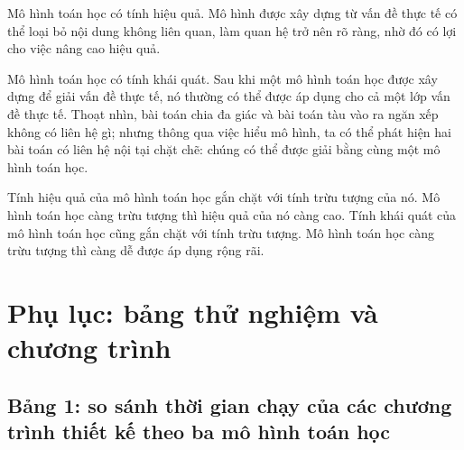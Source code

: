 \documentclass[11pt]{article}
\begin{document}
Mô hình toán học có tính hiệu quả. Mô hình được xây dựng từ vấn đề thực tế có
thể loại bỏ nội dung không liên quan, làm quan hệ trở nên rõ ràng, nhờ đó có
lợi cho việc nâng cao hiệu quả.

Mô hình toán học có tính khái quát. Sau khi một mô hình toán học được xây
dựng để giải vấn đề thực tế, nó thường có thể được áp dụng cho cả một lớp vấn
đề thực tế. Thoạt nhìn, bài toán chia đa giác và bài toán tàu vào ra ngăn xếp
không có liên hệ gì; nhưng thông qua việc hiểu mô hình, ta có thể phát hiện
hai bài toán có liên hệ nội tại chặt chẽ: chúng có thể được giải bằng cùng
một mô hình toán học.

Tính hiệu quả của mô hình toán học gắn chặt với tính trừu tượng của nó. Mô
hình toán học càng trừu tượng thì hiệu quả của nó càng cao. Tính khái quát
của mô hình toán học cũng gắn chặt với tính trừu tượng. Mô hình toán học càng
trừu tượng thì càng dễ được áp dụng rộng rãi.

\appendix
\section{Phụ lục: bảng thử nghiệm và chương trình}
\label{app:tables}

\subsection{Bảng 1: so sánh thời gian chạy của các chương trình thiết kế theo
ba mô hình toán học}
\end{document}
